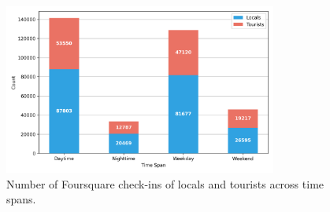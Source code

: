 \documentclass{article}
\theoremstyle{remark}
\begin{document}
\begin{figure}[!h]
\centering
\includegraphics[width=0.8\textwidth]{figures/foursquare_checkins_count.png}
\caption{\label{fig:foursquare_checkins_count}Number of Foursquare check-ins of locals and tourists across time spans.}
\end{figure}
\end{document}
